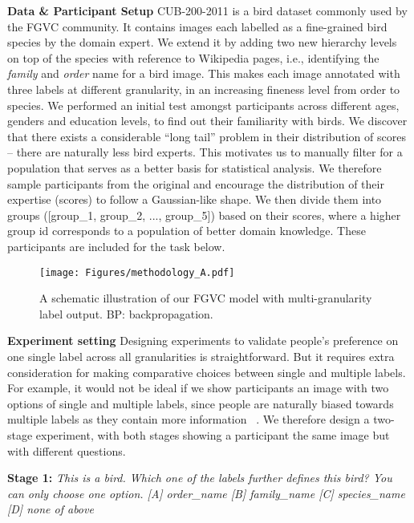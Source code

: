 \documentclass[final]{cvpr}
\newcommand{\keypoint}[1]{\vspace{0.05cm}\noindent\textbf{#1}\quad}
\begin{document}
\keypoint{Data \& Participant Setup} CUB-200-2011 is a bird dataset commonly used by the FGVC community. It contains  images each labelled as a fine-grained bird species by the domain expert. We extend it by adding two new  hierarchy levels  on top of the species with reference to Wikipedia pages, i.e., identifying the \textit{family} and \textit{order} name for a bird image. This makes each image annotated with three labels at different granularity, in an increasing fineness level from order to species. We performed an initial test amongst  participants across different ages, genders and education levels, to find out their familiarity with birds. We discover that there exists a considerable ``long tail'' problem in their distribution of scores -- there are naturally less bird experts. This motivates us to manually filter for a population that serves as a better basis for statistical analysis. We therefore sample  participants from the original  and encourage the distribution of their expertise (scores) to follow a Gaussian-like shape. We then divide them into  groups ([group\_1, group\_2, ..., group\_5]) based on their scores, where a higher group id corresponds to a population of better domain knowledge. These  participants are included for the task below.


\begin{figure*}[t]
\begin{center}
\texttt{[image: Figures/methodology\_A.pdf]}
\end{center}

  \caption{A schematic illustration of our FGVC model with multi-granularity label output.  BP: backpropagation. }

\label{fig:Method}
\end{figure*}



\keypoint{Experiment setting} Designing experiments to validate people's preference on one single label across all granularities is straightforward. But it requires extra consideration for making comparative choices between single and multiple labels. For example, it would not be ideal if we show participants an image with two options of single and multiple labels, since people are naturally biased towards multiple labels as they contain more information ~\cite{thabane2010tutorial}. We therefore design a two-stage experiment, with both stages showing a participant the same image but with different questions.

\noindent\textbf{Stage 1:} \textit{This is a bird. Which one of the labels further defines this bird? You can only choose one option. [A] order\_name [B] family\_name [C] species\_name [D] none of above}
\end{document}

